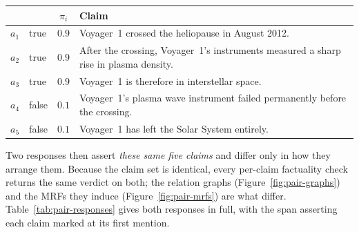 \begin{center}\small
\begin{tabularx}{0.93\textwidth}{@{}l l c X@{}}
\toprule
 & & $\pi_i$ & Claim \\
\midrule
$a_1$ & true  & $0.9$ & Voyager~1 crossed the heliopause in August 2012. \\
$a_2$ & true  & $0.9$ & After the crossing, Voyager~1's instruments measured a sharp rise in plasma density. \\
$a_3$ & true  & $0.9$ & Voyager~1 is therefore in interstellar space. \\
$a_4$ & false & $0.1$ & Voyager~1's plasma wave instrument failed permanently before the crossing. \\
$a_5$ & false & $0.1$ & Voyager~1 has left the Solar System entirely. \\
\bottomrule
\end{tabularx}
\end{center}

Two responses then assert \emph{these same five claims} and differ only in how they arrange them.
Because the claim set is identical, every per-claim factuality check returns the same verdict on
both; the relation graphs (Figure~\ref{fig:pair-graphs}) and the MRFs they induce
(Figure~\ref{fig:pair-mrfs}) are what differ. Table~\ref{tab:pair-responses} gives both responses in
full, with the span asserting each claim marked  at its first mention.

